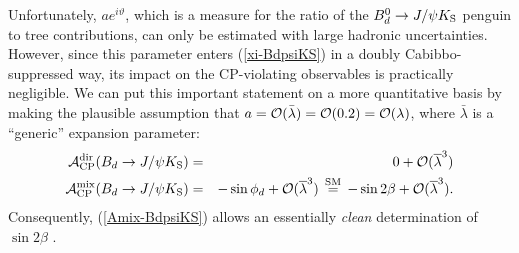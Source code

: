 \documentclass[12pt]{article}
\begin{document}
Unfortunately, $a e^{i\vartheta}$, which is a measure for the ratio of the
$B_d^0\to J/\psi K_{\rm S}$ penguin to tree contributions,
can only be estimated with large hadronic uncertainties. However, since 
this parameter enters (\ref{xi-BdpsiKS}) in a doubly Cabibbo-suppressed way, its 
impact on the CP-violating observables is practically negligible. We can put 
this important statement on a more quantitative basis by making the plausible
assumption that $a={\cal O}(\bar\lambda)={\cal O}(0.2)={\cal O}(\lambda)$,
where $\bar\lambda$ is a ``generic'' expansion parameter:
\begin{eqnarray}
{\cal A}^{\mbox{{\scriptsize dir}}}_{\mbox{{\scriptsize
CP}}}(B_d\to J/\psi K_{\mbox{{\scriptsize S}}})&=&0+
{\cal O}(\overline{\lambda}^3)\label{Adir-BdpsiKS}\\
{\cal A}^{\mbox{{\scriptsize mix}}}_{\mbox{{\scriptsize
CP}}}(B_d\to J/\psi K_{\mbox{{\scriptsize S}}})&=&-\sin\phi_d +
{\cal O}(\overline{\lambda}^3) \, \stackrel{\rm SM}{=} \, -\sin2\beta+
{\cal O}(\overline{\lambda}^3).\label{Amix-BdpsiKS}
\end{eqnarray}
Consequently, (\ref{Amix-BdpsiKS}) allows an essentially {\it clean}
determination of $\sin2\beta$ \cite{bisa}.

%
%
%
\end{document}
